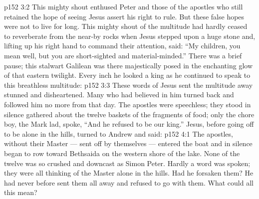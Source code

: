 \vs p152 3:2 This mighty shout enthused Peter and those of the apostles who still retained the hope of seeing Jesus assert his right to rule. But these false hopes were not to live for long. This mighty shout of the multitude had hardly ceased to reverberate from the near\hyp{}by rocks when Jesus stepped upon a huge stone and, lifting up his right hand to command their attention, said: “My children, you mean well, but you are short\hyp{}sighted and material\hyp{}minded.” There was a brief pause; this stalwart Galilean was there majestically posed in the enchanting glow of that eastern twilight. Every inch he looked a king as he continued to speak to this breathless multitude: 
\vs p152 3:3 \pc These words of Jesus sent the multitude away stunned and disheartened. Many who had believed in him turned back and followed him no more from that day. The apostles were speechless; they stood in silence gathered about the twelve baskets of the fragments of food; only the chore boy, the Mark lad, spoke, “And he refused to be our king.” Jesus, before going off to be alone in the hills, turned to Andrew and said: 
\vs p152 4:1 The apostles, without their Master --- sent off by themselves --- entered the boat and in silence began to row toward Bethsaida on the western shore of the lake. None of the twelve was so crushed and downcast as Simon Peter. Hardly a word was spoken; they were all thinking of the Master alone in the hills. Had he forsaken them? He had never before sent them all away and refused to go with them. What could all this mean?
